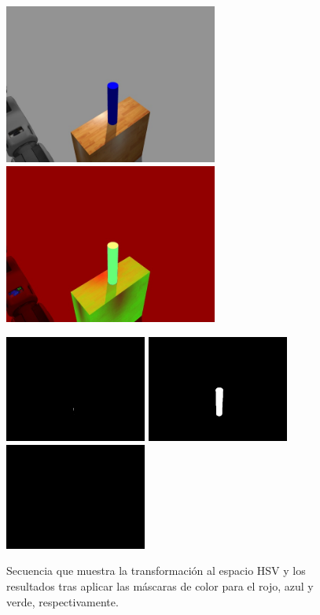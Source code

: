 \documentclass[12pt,spanish,chapterprefix, numbers=noenddot]{book}
\numberwithin{equation}{section}
\numberwithin{figure}{section}
\begin{document}
\begin{figure}[hbt!]
\centering
\includegraphics[width=7cm]{Figs/fase2_1.jpeg}
\includegraphics[width=7cm]{Figs/fase2_2.jpeg}
\par
\centering
\includegraphics[width=4.66cm]{Figs/red_mask.jpeg}
\includegraphics[width=4.66cm]{Figs/blue_mask.jpeg}
\includegraphics[width=4.66cm]{Figs/green_mask.jpeg}
\par
\caption{\label{fig:masks}Secuencia que muestra la transformación al espacio HSV y los resultados tras aplicar las máscaras de color para el rojo, azul y verde, respectivamente.}
\end{figure}
\end{document}
